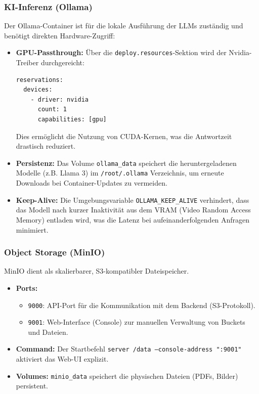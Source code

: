 \subsubsection{KI-Inferenz (Ollama)}
Der Ollama-Container ist für die lokale Ausführung der LLMs zuständig und benötigt direkten Hardware-Zugriff:
\begin{itemize}
    \item \textbf{GPU-Passthrough:} Über die \texttt{deploy.resources}-Sektion wird der Nvidia-Treiber durchgereicht:
    \begin{verbatim}
reservations:
  devices:
    - driver: nvidia
      count: 1
      capabilities: [gpu]
    \end{verbatim}
    Dies ermöglicht die Nutzung von CUDA-Kernen, was die Antwortzeit drastisch reduziert.
    \item \textbf{Persistenz:} Das Volume \texttt{ollama\_data} speichert die heruntergeladenen Modelle (z.B. Llama 3) im \texttt{/root/.ollama} Verzeichnis, um erneute Downloads bei Container-Updates zu vermeiden.
    \item \textbf{Keep-Alive:} Die Umgebungsvariable \texttt{OLLAMA\_KEEP\_ALIVE} verhindert, dass das Modell nach kurzer Inaktivität aus dem VRAM (Video Random Access Memory) entladen wird, was die Latenz bei aufeinanderfolgenden Anfragen minimiert.
\end{itemize}

\subsubsection{Object Storage (MinIO)}
MinIO dient als skalierbarer, S3-kompatibler Dateispeicher.
\begin{itemize}
    \item \textbf{Ports:}
    \begin{itemize}
        \item \texttt{9000}: API-Port für die Kommunikation mit dem Backend (S3-Protokoll).
        \item \texttt{9001}: Web-Interface (Console) zur manuellen Verwaltung von Buckets und Dateien.
    \end{itemize}
    \item \textbf{Command:} Der Startbefehl \texttt{server /data --console-address ":9001"} aktiviert das Web-UI explizit.
    \item \textbf{Volumes:} \texttt{minio\_data} speichert die physischen Dateien (PDFs, Bilder) persistent.
\end{itemize}

